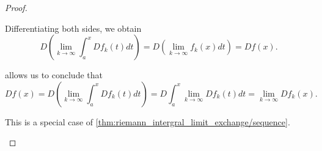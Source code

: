 \begin{proof}
\begin{description}
    Differentiating both sides, we obtain
    \begin{equation*}
      D\left(\lim_{k \to \infty} \int_a^x D f_k(t) dt \right)
      =
      D\left(\lim_{k \to \infty} f_k(x) dt \right)
      =
      D f(x).
    \end{equation*}

     allows us to conclude that
    \begin{equation*}
      D f(x)
      =
      D\left(\lim_{k \to \infty} \int_a^x D f_k(t) dt \right)
      =
      D \int_a^x \lim_{k \to \infty} D f_k(t) dt
      =
      \lim_{k \to \infty} D f_k(x).
    \end{equation*}

     This is a special case of \cref{thm:riemann_intergral_limit_exchange/sequence}.
  \end{description}
\end{proof}
